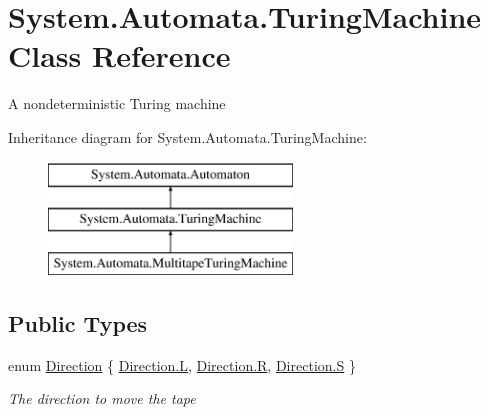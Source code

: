 \hypertarget{class_system_1_1_automata_1_1_turing_machine}{}\section{System.\+Automata.\+Turing\+Machine Class Reference}
\label{class_system_1_1_automata_1_1_turing_machine}


A nondeterministic Turing machine  


Inheritance diagram for System.\+Automata.\+Turing\+Machine\+:\begin{figure}[H]
\begin{center}
\leavevmode
\includegraphics[height=3.000000cm]{class_system_1_1_automata_1_1_turing_machine}
\end{center}
\end{figure}
\subsection*{Public Types}
\begin{DoxyCompactItemize}
\item 
enum \mbox{\hyperlink{class_system_1_1_automata_1_1_turing_machine_aa253c3820befa3cfdd3d17b2d8fdd2d9}{Direction}} \{ \mbox{\hyperlink{class_system_1_1_automata_1_1_turing_machine_aa253c3820befa3cfdd3d17b2d8fdd2d9ad20caec3b48a1eef164cb4ca81ba2587}{Direction.\+L}}, 
\mbox{\hyperlink{class_system_1_1_automata_1_1_turing_machine_aa253c3820befa3cfdd3d17b2d8fdd2d9ae1e1d3d40573127e9ee0480caf1283d6}{Direction.\+R}}, 
\mbox{\hyperlink{class_system_1_1_automata_1_1_turing_machine_aa253c3820befa3cfdd3d17b2d8fdd2d9a5dbc98dcc983a70728bd082d1a47546e}{Direction.\+S}}
 \}
\begin{DoxyCompactList}\small\item\em The direction to move the tape \end{DoxyCompactList}\end{DoxyCompactItemize}
